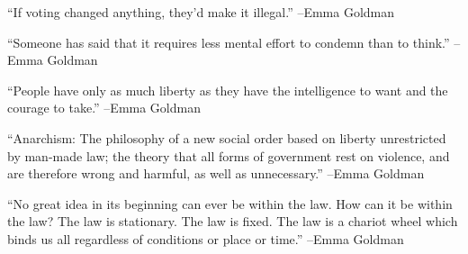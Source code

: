 \documentclass{article}%
\begin{document}
\linebreak%
\vspace{1mm}%
\begin{minipage}{\textwidth}%
\flushleft%
“If voting changed anything, they'd make it illegal.”%
\linebreak%
\vspace{1mm}%
–Emma Goldman%
\linebreak%
\vspace{1mm}%
\end{minipage}%
\linebreak%
\vspace{1mm}%
\begin{minipage}{\textwidth}%
\flushleft%
“Someone has said that it requires less mental effort to condemn than to think.”%
\linebreak%
\vspace{1mm}%
–Emma Goldman%
\linebreak%
\vspace{1mm}%
\end{minipage}%
\linebreak%
\vspace{1mm}%
\begin{minipage}{\textwidth}%
\flushleft%
“People have only as much liberty as they have the intelligence to want and the courage to take.”%
\linebreak%
\vspace{1mm}%
–Emma Goldman%
\linebreak%
\vspace{1mm}%
\end{minipage}%
\linebreak%
\vspace{1mm}%
\begin{minipage}{\textwidth}%
\flushleft%
“Anarchism: The philosophy of a new social order based on liberty unrestricted by man{-}made law; the theory that all forms of government rest on violence, and are therefore wrong and harmful, as well as unnecessary.”%
\linebreak%
\vspace{1mm}%
–Emma Goldman%
\linebreak%
\vspace{1mm}%
\end{minipage}%
\linebreak%
\vspace{1mm}%
\begin{minipage}{\textwidth}%
\flushleft%
“No great idea in its beginning can ever be within the law. How can it be within the law? The law is stationary. The law is fixed. The law is a chariot wheel which binds us all regardless of conditions or place or time.”%
\linebreak%
\vspace{1mm}%
–Emma Goldman%
\linebreak%
\vspace{1mm}%
\end{minipage}%
\end{document}
